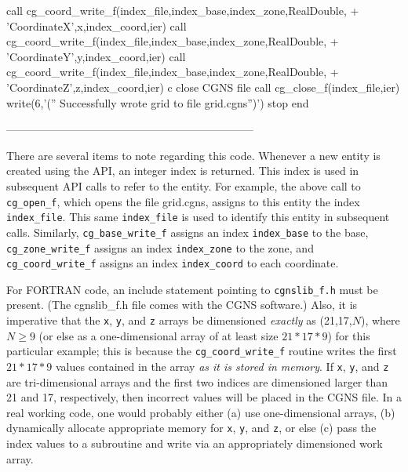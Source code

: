\documentclass[12pt]{article}
\begin{document}
{\newline\indent      call cg\_coord\_write\_f(index\_file,index\_base,index\_zone,RealDouble,
\newline + \indent 'CoordinateX',x,index\_coord,ier)
\newline\indent      call cg\_coord\_write\_f(index\_file,index\_base,index\_zone,RealDouble,
\newline + \indent 'CoordinateY',y,index\_coord,ier)
\newline\indent      call cg\_coord\_write\_f(index\_file,index\_base,index\_zone,RealDouble,
\newline + \indent 'CoordinateZ',z,index\_coord,ier)
\newline c  close CGNS file
\newline\indent      call cg\_close\_f(index\_file,ier)
\newline\indent      write(6,'('' Successfully wrote grid to file grid.cgns'')')
\newline\indent      stop
\newline\indent      end
}

--------------------------------------------------------------------

\noindent There are several items to note regarding this
code.  Whenever a new entity is created using the API,
an integer index is returned.  This index is used in subsequent
API calls to refer to the entity.  For example, the above call to
{\tt cg\_open\_f}, which opens the file grid.cgns, assigns to this
entity the index {\tt index\_file}.  This same {\tt index\_file}
is used to identify this entity in subsequent calls.
Similarly, {\tt cg\_base\_write\_f} assigns an index {\tt index\_base} to
the base, {\tt cg\_zone\_write\_f} 
assigns an index {\tt index\_zone} to the zone, and
{\tt cg\_coord\_write\_f} assigns an index {\tt index\_coord}
to each coordinate.

For FORTRAN code, an include statement
pointing to {\tt cgnslib\_f.h} must be present.  (The cgnslib\_f.h
file comes with the CGNS software.)  Also, it is
imperative that the {\tt x}, {\tt y}, and {\tt z} arrays be dimensioned
{\it exactly} as (21,17,$N$), where $N \geq 9$ (or
else as a one-dimensional array of at least size $21*17*9$) 
for this particular example; 
this is because the {\tt cg\_coord\_write\_f}
routine writes the first $21*17*9$ values contained in the
array {\it as it is stored
in memory}.  If {\tt x}, {\tt y}, and {\tt z} are tri-dimensional arrays
and the first two indices 
are dimensioned larger than 21 and 17, respectively, then incorrect
values will be placed in the CGNS file.  In a real
working code, one would probably either (a) use one-dimensional
arrays, (b) dynamically allocate
appropriate memory for {\tt x}, {\tt y}, and {\tt z}, or else (c) pass the index
values to a subroutine and write via an appropriately dimensioned
work array.
\end{document}
